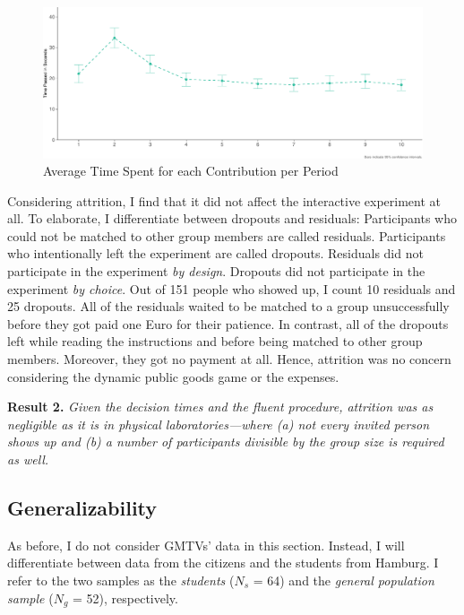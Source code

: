 \documentclass[
  authoryear,
  review,
  3p,
  onecolumn]{elsarticle}
\begin{document}
\begin{figure}

{\centering \includegraphics{paper_files/figure-pdf/fig-time-spent-1.pdf}

}

\caption{\label{fig-time-spent}Average Time Spent for each Contribution
per Period}

\end{figure}

Considering attrition, I find that it did not affect the interactive
experiment at all. To elaborate, I differentiate between dropouts and
residuals: Participants who could not be matched to other group members
are called residuals. Participants who intentionally left the experiment
are called dropouts. Residuals did not participate in the experiment
\emph{by design}. Dropouts did not participate in the experiment
\emph{by choice}. Out of 151 people who showed up, I count 10 residuals
and 25 dropouts. All of the residuals waited to be matched to a group
unsuccessfully before they got paid one Euro for their patience. In
contrast, all of the dropouts left while reading the instructions and
before being matched to other group members. Moreover, they got no
payment at all. Hence, attrition was no concern considering the dynamic
public goods game or the expenses.

\textbf{Result 2.} \emph{Given the decision times and the fluent
procedure, attrition was as negligible as it is in physical
laboratories---where (a) not every invited person shows up and (b) a
number of participants divisible by the group size is required as well.}

\hypertarget{sec-generalizability}{%
\subsection{Generalizability}\label{sec-generalizability}}

As before, I do not consider GMTVs' data in this section. Instead, I
will differentiate between data from the citizens and the students from
Hamburg. I refer to the two samples as the \emph{students} (\(N_s\) =
64) and the \emph{general population sample} (\(N_g\) = 52),
respectively.
\end{document}
